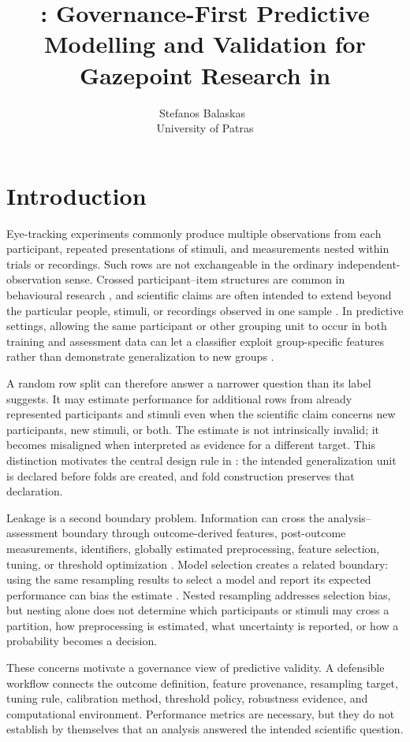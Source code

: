 \documentclass[article]{jss}
\author{Stefanos Balaskas~\orcidlink{0000-0003-2444-9796}\\University of Patras}
\title{\pkg{gp3ml}: Governance-First Predictive Modelling and Validation for Gazepoint Research in \proglang{R}}
\begin{document}
\section{Introduction}
\label{sec:introduction}

Eye-tracking experiments commonly produce multiple observations from each participant,
repeated presentations of stimuli, and measurements nested within trials or recordings.
Such rows are not exchangeable in the ordinary independent-observation sense. Crossed
participant--item structures are common in behavioural research
\citep{Baayen2008,Barr2013}, and scientific claims are often intended to extend beyond
the particular people, stimuli, or recordings observed in one sample \citep{Yarkoni2022}.
In predictive settings, allowing the same participant or other grouping unit to occur in
both training and assessment data can let a classifier exploit group-specific features
rather than demonstrate generalization to new groups \citep{scikitLearnDocs2026}.

A random row split can therefore answer a narrower question than its label suggests. It
may estimate performance for additional rows from already represented participants and
stimuli even when the scientific claim concerns new participants, new stimuli, or both.
The estimate is not intrinsically invalid; it becomes misaligned when interpreted as
evidence for a different target. This distinction motivates the central design rule in
: the intended generalization unit is declared before folds are created, and
fold construction preserves that declaration.

Leakage is a second boundary problem. Information can cross the analysis--assessment
boundary through outcome-derived features, post-outcome measurements, identifiers,
globally estimated preprocessing, feature selection, tuning, or threshold optimization
\citep{Kaufman2012,Kapoor2023}. Model selection creates a related boundary: using the
same resampling results to select a model and report its expected performance can bias
the estimate \citep{Varma2006,Cawley2010}. Nested resampling addresses selection bias,
but nesting alone does not determine which participants or stimuli may cross a
partition, how preprocessing is estimated, what uncertainty is reported, or how a
probability becomes a decision.

These concerns motivate a governance view of predictive validity. A defensible workflow
connects the outcome definition, feature provenance, resampling target, tuning rule,
calibration method, threshold policy, robustness evidence, and computational
environment. Performance metrics are necessary, but they do not establish by
themselves that an analysis answered the intended scientific question.
\end{document}

